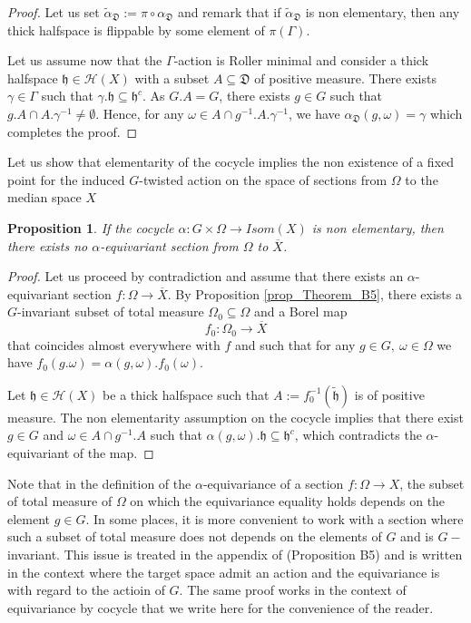 \documentclass{amsart}
\numberwithin{equation}{section}
\newtheorem{prop}[thm]{Proposition}
\newcommand{\HH}{\mathcal{H}}     %
\newcommand{\hh}{\mathfrak{h}}    %
\theoremstyle{definition}
\def\bar{\overline}
\begin{document}
\begin{proof}
Let us set $\tilde{\alpha}_\mathfrak{D}:=\pi\circ \alpha_\mathfrak{D}$ and remark that if $\tilde{\alpha}_\mathfrak{D}$ is non elementary, then any thick halfspace is flippable by some element of $\pi(\Gamma)$. \par 
Let us assume now that the $\Gamma$-action is Roller minimal and consider a thick halfspace $\hh\in\HH(X)$ with a subset $A\subseteq \mathfrak{D}$ of positive measure. There exists $\gamma\in \Gamma$ such that $\gamma.\hh\subseteq \hh^c$. As $G.A=G$, there exists $g\in G$ such that $g.A\cap A.\gamma^{-1} \neq \emptyset$. Hence, for any $\omega\in A\cap g^{-1}.A.\gamma^{-1}$, we have $\alpha_{\mathfrak{D}}(g,\omega)=\gamma$ which completes the proof.
\end{proof}


Let us show that elementarity of the cocycle implies the non existence of a fixed point for the induced $G$-twisted action on the space of sections from $\Omega$ to the median space $X$
\begin{prop}\label{prop_no_equivariant_section}
    If the cocycle $\alpha:G\times \Omega \rightarrow Isom(X)$ is non elementary, then there exists no $\alpha$-equivariant section from $\Omega$ to $\bar X$.
\end{prop}
\begin{proof}
    Let us proceed by contradiction and assume that there exists an $\alpha$-equivariant section $f:\Omega\rightarrow \bar X$. By Proposition \ref{prop_Theorem_B5}, there exists a $G$-invariant subset of total measure $\Omega_0\subseteq \Omega$ and a Borel map $$f_0:\Omega_0\rightarrow \bar X $$ that coincides almost everywhere with $f$ and such that for any $g\in G,\ \omega\in \Omega$ we have $f_0(g.\omega)=\alpha(g,\omega).f_0(\omega)$. \par 
    Let $\hh\in\HH(X)$ be a thick halfspace such that $A:=f_0^{-1}(\tilde{\hh})$ is of positive measure. The non elementarity assumption on the cocycle implies that there exist $g\in G$ and $\omega\in A\cap g^{-1}.A$ such that $\alpha(g,\omega).\hh\subseteq \hh^c$, which contradicts the $\alpha$-equivariant of the map.
\end{proof}





Note that in the definition of the $\alpha$-equivariance of a section $f:\Omega\rightarrow X$, the subset of total measure of $\Omega$ on which the equivariance equality holds depends on the element $g\in G$. In some places, it is more convenient to work with a section where such a subset of total measure does not depends on the elements of $G$ and is $G-$invariant. This issue is treated in the appendix of \cite{Zimmer} (Proposition B5) and is written in the context where the target space admit an action and the equivariance is with regard to the actioin of $G$. The same proof works in the context of equivariance by cocycle that we write here for the convenience of the reader. 
\end{document}
